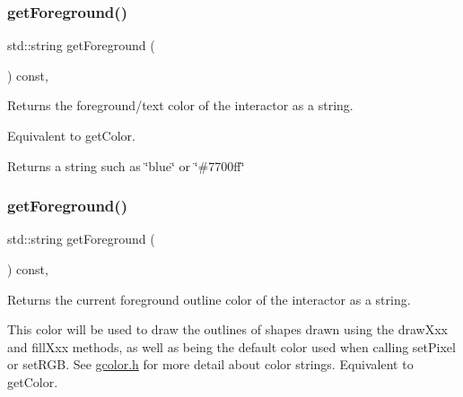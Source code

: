\mbox{\label{classGInteractor_a4fa2d8b0192a3a5b4af4bbfe71194d03}} 
\subsubsection{\texorpdfstring{get\+Foreground()}{getForeground()}\hspace{0.1cm}{\footnotesize\ttfamily [1/2]}}
{\footnotesize\ttfamily std\+::string get\+Foreground (\begin{DoxyParamCaption}{ }\end{DoxyParamCaption}) const\hspace{0.3cm}{\ttfamily [virtual]}, {\ttfamily [inherited]}}



Returns the foreground/text color of the interactor as a string. 

Equivalent to get\+Color. \begin{DoxyReturn}{Returns}
a string such as \char`\"{}blue\char`\"{} or \char`\"{}\#7700ff\char`\"{} 
\end{DoxyReturn}
\mbox{\label{classGDrawingSurface_a4fa2d8b0192a3a5b4af4bbfe71194d03}} 
\subsubsection{\texorpdfstring{get\+Foreground()}{getForeground()}\hspace{0.1cm}{\footnotesize\ttfamily [2/2]}}
{\footnotesize\ttfamily std\+::string get\+Foreground (\begin{DoxyParamCaption}{ }\end{DoxyParamCaption}) const\hspace{0.3cm}{\ttfamily [virtual]}, {\ttfamily [inherited]}}



Returns the current foreground outline color of the interactor as a string. 

This color will be used to draw the outlines of shapes drawn using the draw\+Xxx and fill\+Xxx methods, as well as being the default color used when calling set\+Pixel or set\+R\+GB. See \mbox{\hyperlink{gcolor_8h_source}{gcolor.\+h}} for more detail about color strings. Equivalent to get\+Color. \mbox{\label{classGInteractor_ac3b12ab385a6ef9ae90fc879860ba726}} 
